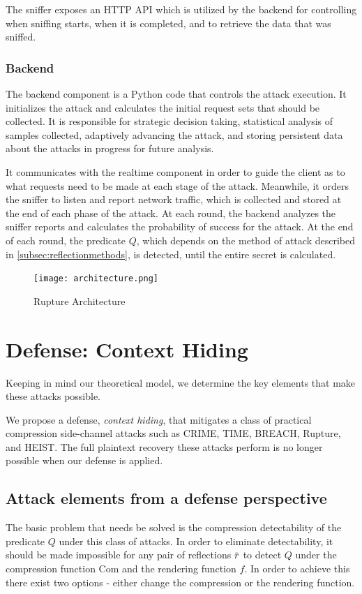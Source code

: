 \documentclass[conference, letterpaper, 10pt]{IEEEtran}
\newcommand{\overbar}[1]{\mkern 1.5mu\overline{\mkern-1.5mu#1\mkern-1.5mu}\mkern 1.5mu}
\begin{document}
The sniffer exposes an HTTP API which is utilized by the backend for controlling
when sniffing starts, when it is completed, and to retrieve the data that was
sniffed.

\subsubsection{Backend}

The backend component is a Python code that controls the attack execution. It
initializes the attack and calculates the initial request sets that should be
collected. It is responsible for strategic decision taking, statistical
analysis of samples collected, adaptively advancing the attack, and storing
persistent data about the attacks in progress for future analysis.

It communicates with the realtime component in order to guide the client as to
what requests need to be made at each stage of the attack. Meanwhile, it orders
the sniffer to listen and report network traffic, which is collected and stored
at the end of each phase of the attack. At each round, the backend analyzes the
sniffer reports and calculates the probability of success for the attack. At the
end of each round, the predicate $Q$, which depends on the method of attack described
in \ref{subsec:reflectionmethods}, is detected, until the entire secret is
calculated.

   \begin{figure}[thpb]
      \centering
          \texttt{[image: architecture.png]}
      \caption{Rupture Architecture}
   \end{figure}

\section{Defense: Context Hiding}\label{sec:defense}
Keeping in mind our theoretical model, we determine the key elements that make these
attacks possible.

We propose a defense, \textit{context hiding}, that mitigates a class of
practical compression side-channel attacks such as CRIME, TIME, BREACH, Rupture,
and HEIST. The full plaintext recovery these attacks perform is no longer
possible when our defense is applied.

\subsection{Attack elements from a defense perspective}
The basic problem that needs be solved is the compression detectability of
the predicate $Q$ under this class of attacks. In order to eliminate detectability,
it should be made impossible for any pair of reflections $\overbar{r}$ to detect
$Q$ under the compression function $\textrm{Com}$ and the rendering function $f$. In order to
achieve this there exist two options - either change the compression or the
rendering function.
\end{document}

